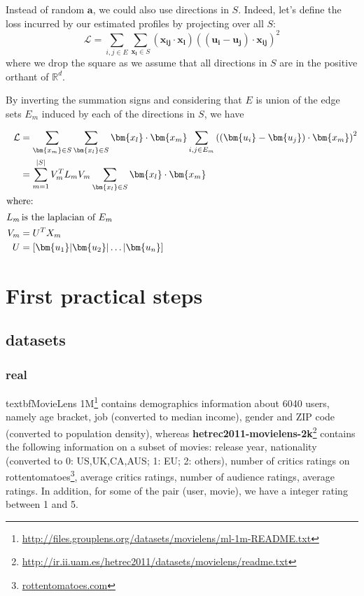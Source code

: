 Instead of random $\bm{a}$, we could also use directions in $S$. Indeed, let's
define the loss incurred by our estimated profiles by projecting over all $S$:
\begin{equation*}
	\mathcal{L} = \sum_{i,j \in E} \sum_{\bm{x_l} \in S}
	(\bm{x_{ij}}\cdot \bm{x_l}) \left( (\bm{u_i} - \bm{u_j} ) \cdot \bm{x_{ij}} \right )^2
\end{equation*}
where we drop the square as we assume that all directions in $S$ are in the
positive orthant of $\mathbb{R}^d$.

By inverting the summation signs and considering that $E$ is union of the edge
sets $E_m$ induced by each of the directions in $S$, we have

\begin{align*}
	\mathcal{L}        & = \sum_{\bm{x_m} \in S} \sum_{\bm{x_l} \in S} \bm{x_l}\cdot\bm{x_m}
	\sum_{i,j \in E_m} \left( (\bm{u_i} - \bm{u_j} ) \cdot \bm{x_m} \right )^2 \\
                       & = \sum_{m=1}^{|S|} V_m^T L_m V_m \sum_{\bm{x_l} \in S}\bm{x_l}\cdot\bm{x_m}\\
	\shortintertext{where:}
	L_m                & \, \text{is the laplacian of $E_m$} \\
	V_m                & = U^T X_m \\
	U                  & = [\bm{u_1} | \bm{u_2} | \ldots | \bm{u_n} ]
\end{align*}

\section{First practical steps}


\subsection{datasets}

\subsubsection{real}

textbf{MovieLens 1M}\footnote{%
\href{http://files.grouplens.org/datasets/movielens/ml-1m-README.txt}%
{http://files.grouplens.org/datasets/movielens/ml-1m-README.txt}} contains
demographics information about 6040 users, namely age bracket, job (converted
to median income), gender and ZIP code (converted to population density),
whereas \textbf{hetrec2011-movielens-2k}\footnote{%
\href{http://ir.ii.uam.es/hetrec2011/datasets/movielens/readme.txt}%
{http://ir.ii.uam.es/hetrec2011/datasets/movielens/readme.txt}} contains the
following information on a subset of movies: release year, nationality
(converted to 0: US,UK,CA,AUS; 1: EU; 2: others), number of critics ratings on
rottentomatoes\footnote{\href{http://www.rottentomatoes.com/}{rottentomatoes.com}},
average critics ratings, number of audience ratings, average ratings. In
addition, for some of the pair (user, movie), we have a integer rating between
1 and 5.

